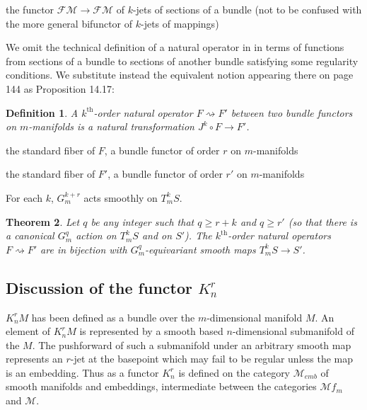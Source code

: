 \documentclass[12pt]{article}
\numberwithin{equation}{section}
\theoremstyle{plain}
\newtheorem{definition}{Definition}[section]
\newtheorem{theorem}[definition]{Theorem}
\theoremstyle{definition}
\newcommand{\M}{\mathcal{M}}
\newcommand{\ra}{\rightarrow}
\renewcommand{\sp}[2][1.3cm]{\makebox[#1][l]{#2}}
\begin{document}
\sp{$J^{k}$} the functor $\mathcal{FM}\ra \mathcal{FM}$ of $k$-jets of sections of a bundle (not to be confused with the more general bifunctor of $k$-jets of mappings)

We omit the technical definition of a natural operator in \cite{kms} in terms of functions from sections of a bundle to sections of another bundle satisfying some regularity conditions. We substitute instead the equivalent notion appearing there on page 144 as Proposition 14.17:

\begin{definition} A \emph{$k^\text{th}$-order natural operator $F\rightsquigarrow F'$} between two bundle functors on $m$-manifolds is a natural transformation $J^{k}\circ F\ra F'$.
\end{definition}

\sp{$S$} the standard fiber of $F$, a bundle functor of order $r$ on $m$-manifolds

\sp{$S'$} the standard fiber of $F'$, a bundle functor of order $r'$ on $m$-manifolds

For each $k$, $G^{k+r}_{m}$ acts smoothly on $T^{k}_{m}S$.

\begin{theorem}\label{characterizeNaturalOps} Let $q$ be any integer such that $q\geq r+k$ and $q\geq r'$ (so that there is a canonical $G^{q}_{m}$ action on $T^{k}_{m}S$ and on $S'$). The $k^\text{th}$-order natural operators $F\rightsquigarrow F'$ are in bijection with $G^{q}_{m}$-equivariant smooth maps $T^{k}_{m}S\ra S'$.
\end{theorem}



\subsection{Discussion of the functor $K^{r}_{n}$}

$K^{r}_{n}M$ has been defined as a bundle over the $m$-dimensional manifold $M$. An element of $K^{r}_{n}M$ is represented by a smooth based $n$-dimensional submanifold of the $M$. The pushforward of such a submanifold under an arbitrary smooth map represents an $r$-jet at the basepoint which may fail to be regular unless the map is an embedding. Thus as a functor $K^{r}_{n}$ is defined on the category $\M_{emb}$ of smooth manifolds and embeddings, intermediate between the categories $\M f_{m}$ and $\M$.
\end{document}
